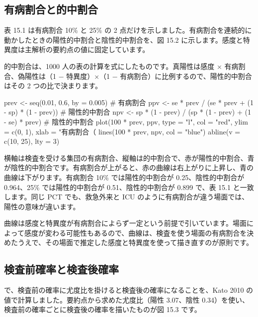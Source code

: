 \subsection{有病割合と的中割合}
\label{sec:15-1-2}

表 15.1 は有病割合 10\% と 25\% の 2 点だけを示しました。有病割合を連続的に動かしたときの陽性的中割合と陰性的中割合を、図 15.2 に示します。感度と特異度は主解析の要約点の値に固定しています。


的中割合は、1000 人の表の計算を式にしたものです。真陽性は感度 × 有病割合、偽陽性は（1 − 特異度）×（1 − 有病割合）に比例するので、陽性的中割合はその 2 つの比で決まります。

\begin{rcode}
prev <- seq(0.01, 0.6, by = 0.005)     # 有病割合
ppv <- se * prev /
  (se * prev + (1 - sp) * (1 - prev))  # 陽性的中割合
npv <- sp * (1 - prev) /
  (sp * (1 - prev) + (1 - se) * prev)  # 陰性的中割合
plot(100 * prev, ppv, type = "l", col = "red", ylim = c(0, 1),
     xlab = "有病割合（%
lines(100 * prev, npv, col = "blue")
abline(v = c(10, 25), lty = 3)
\end{rcode}

横軸は検査を受ける集団の有病割合、縦軸は的中割合で、赤が陽性的中割合、青が陰性的中割合です。有病割合が上がると、赤の曲線は右上がりに上昇し、青の曲線は下がります。有病割合 10\% では陽性的中割合が 0.25、陰性的中割合が 0.964、25\% では陽性的中割合が 0.51、陰性的中割合が 0.899 で、表 15.1 と一致します。同じ PCT でも、救急外来と ICU のように有病割合が違う場面では、陽性の意味が違います。

曲線は感度と特異度が有病割合によらず一定という前提で引いています。場面によって感度が変わる可能性もあるので、曲線は、検査を使う場面の有病割合を決めたうえで、その場面で推定した感度と特異度を使って描き直すのが原則です。

\subsection{\hatten 検査前確率と検査後確率}
\label{sec:15-1-3}

で、検査前の確率に尤度比を掛けると検査後の確率になることを、Kato 2010 の値で計算しました。要約点から求めた尤度比（陽性 3.07、陰性 0.34）を使い、検査前の確率ごとに検査後の確率を描いたものが図 15.3 です。

